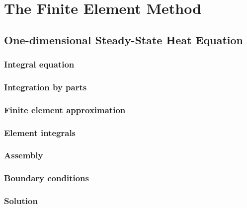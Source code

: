 \chapter{The Finite Element Method}
\label{cha:FiniteElementMethod}

\section{One-dimensional Steady-State Heat Equation}
\label{sec:OneDSteadyStateHeatEquation}

\subsection{Integral equation}
\label{subsec:IntegralEquation}

\subsection{Integration by parts}
\label{subsec:IntegrationByParts}

\subsection{Finite element approximation}
\label{subsec:FiniteElementApproximation}

\subsection{Element integrals}
\label{subsec:ElementIntegrals}

\subsection{Assembly}
\label{subsec:Assembly}


\subsection{Boundary conditions}
\label{subsec:BoundaryConditions}

\subsection{Solution}
\label{subsec:Solution}

